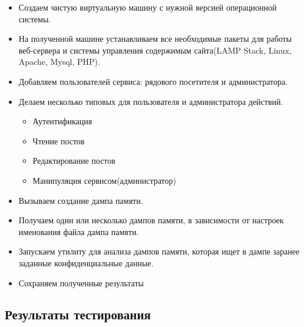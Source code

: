 \documentclass[20pt]{article}
\begin{document}
\begin{itemize}
  \item Создаем чистую виртуальную машину с нужной версией операционной системы.
  \item На полученной машине устанавливаем все необходимые пакеты для работы
  веб-сервера и системы управления содержимым сайта(LAMP Stack, Linux, Apache,
  Mysql, PHP).
  \item Добавляем пользователей сервиса: рядового посетителя и администратора.
  \item Делаем несколько типовых для пользователя и администратора действий.
  \begin{itemize}
    \item Аутентификация
    \item Чтение постов
    \item Редактирование постов
    \item Манипуляция сервисом(администратор)
  \end{itemize}
  \item Вызываем создание дампа памяти.
  \item Получаем один или несколько дампов памяти, в зависимости от настроек
  именования файла дампа памяти.
  \item Запускаем утилиту для анализа дампов памяти, которая ищет в дампе
  заранее заданные конфиденциальные данные.
  \item Сохраняем полученные результаты
\end{itemize}

\subsection{Результаты тестирования}
\end{document}
